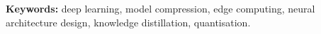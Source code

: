 \vspace{10mm}
\noindent\textbf{Keywords:} deep learning, model compression, edge computing,
neural architecture design, knowledge distillation, quantisation.

\newpage

\tableofcontents
\newpage
\listoffigures
\newpage
\listoftables
\newpage

\mainmatter

